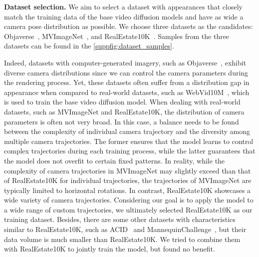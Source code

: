 \noindent \textbf{Dataset selection.}
We aim to select a dataset with appearances that closely match the training data of the base video diffusion models and have as wide a camera pose distribution as possible.
%
We choose three datasets as the candidates: Objaverse~\citep{objaverse}, MVImageNet~\citep{mvimgnet}, and RealEstate10K~\citep{realestate10k}.
%
Samples from the three datasets can be found in the \cref{suppfig:dataset_samples}.

Indeed, datasets with computer-generated imagery, such as Objaverse~\citep{objaverse}, exhibit diverse camera distributions since we can control the camera parameters during the rendering process.
Yet, these datasets often suffer from a distribution gap in appearance when compared to real-world datasets, such as WebVid10M~\citep{webvid10m}, which is used to train the base video diffusion model.
%
%
When dealing with real-world datasets, such as MVImageNet and RealEstate10K, the distribution of camera parameters is often not very broad.
%
In this case, a balance needs to be found between the complexity of individual camera trajectory and the diversity among multiple camera trajectories.
%
The former ensures that the model learns to control complex trajectories during each training process, while the latter guarantees that the model does not overfit to certain fixed patterns.
%
In reality, while the complexity of camera trajectories in MVImageNet may slightly exceed than that of RealEstate10K for individual trajectories, the trajectories of MVImageNet are typically limited to horizontal rotations.
%
In contrast, RealEstate10K showcases a wide variety of camera trajectories. 
% 
Considering our goal is to apply the model to a wide range of custom trajectories, we ultimately selected RealEstate10K as our training dataset.
%
Besides, there are some other datasets with characteristics similar to RealEstate10K, such as ACID~\citep{acid} and MannequinChallenge~\citep{MannequinChallenge}, but their data volume is much smaller than RealEstate10K. 
% 
We tried to combine them with RealEstate10K to jointly train the \method model, but found no benefit.

